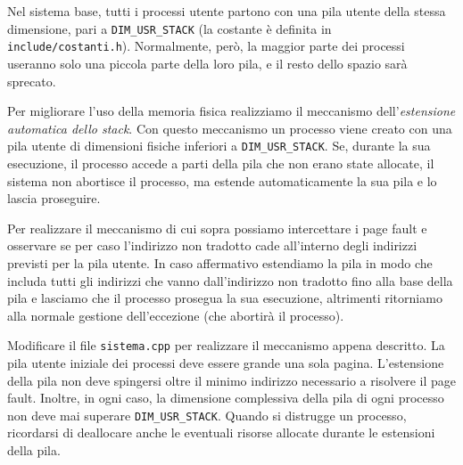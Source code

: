 Nel sistema base, tutti i processi utente partono con una pila utente della
stessa dimensione, pari a {\tt DIM\_USR\_STACK} (la costante \`e definita in {\tt include/costanti.h}).
Normalmente, per\`o, la maggior parte dei processi
useranno solo una piccola parte della loro pila, e il resto dello spazio sar\`a sprecato.

Per migliorare l'uso della memoria fisica realizziamo il meccanismo dell'{\em estensione automatica dello stack}.
Con questo meccanismo un processo viene creato con una pila utente di dimensioni fisiche inferiori a {\tt DIM\_USR\_STACK}\@. Se, durante
la sua esecuzione, il processo accede a parti della pila che non erano state allocate, il sistema non abortisce il processo,
ma estende automaticamente la sua pila e lo lascia proseguire.

Per realizzare il meccanismo di cui sopra possiamo intercettare i page fault e osservare se per caso
l'indirizzo non tradotto cade all'interno degli indirizzi previsti per la pila utente. In caso
affermativo estendiamo la pila in modo che includa tutti gli indirizzi che vanno dall'indirizzo non tradotto
fino alla base della pila e lasciamo che il processo prosegua la sua esecuzione,
altrimenti ritorniamo alla normale gestione dell'eccezione (che abortir\`a il processo).

Modificare il file {\tt sistema.cpp} per realizzare il meccanismo appena descritto. La pila utente iniziale
dei processi deve essere grande una sola pagina. L'estensione della pila non deve spingersi oltre il minimo
indirizzo necessario a risolvere il page fault. Inoltre, in ogni caso, la dimensione complessiva della pila di ogni processo non deve mai
superare {\tt DIM\_USR\_STACK}\@. Quando si distrugge un processo, ricordarsi di deallocare anche le eventuali risorse
allocate durante le estensioni della pila.
